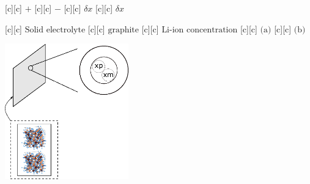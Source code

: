 \begin{Figure}
    \centering
    \footnotesize
		
		 {$+$}
		 {$-$}
		 {$\delta x$}
		 {$\delta x$}
		
		 {$\text{Solid electrolyte}$}
		 {$\text{graphite}$}
		 {$\text{Li-ion concentration}$}
		 {$\text{(a)}$}
		 {$\text{(b)}$}
		
		
		
    \includegraphics[width=0.4\textwidth]{polar.eps}
		
\end{Figure}


